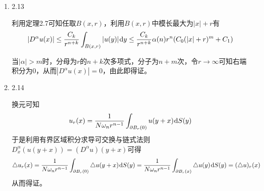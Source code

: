 \documentclass[a4paper,UTF8,fontset=windows,10pt]{ctexart}
\newcommand*{\dr}{\hspace{0.07em}\mathrm{d}}
\begin{document}
\begin{enumerate}
    \item 2.13
    
    利用定理2.7可知任取$B(x,r)$，利用$B(x,r)$中模长最大为$|x|+r$有
    $$|D^\alpha u(x)|\le\frac{C_k}{r^{n+k}}\int_{B(x,r)}|u(y)|\dr y\le\frac{C_k}{r^{n+k}}\alpha(n)r^n(C_0(|x|+r)^m+C_1)$$
    
    当$|\alpha|>m$时，分母为$r$的$n+k$次多项式，分子为$n+m$次，令$r\to\infty$可知右端积分为0，从而$|D^\alpha u(x)|=0$，由此即得证。
    
    \item 2.14
    
    换元可知
    $$u_r(x)=\frac{1}{N\omega_nr^{n-1}}\int_{\partial B_r(0)}u(y+x)\dr S(y)$$
    于是利用有界区域积分求导可交换与链式法则$D_x^\alpha(u(y+x))=(D^\alpha u)(y+x)$可得
    $$\triangle u_r(x)=\frac{1}{N\omega_nr^{n-1}}\int_{\partial B_r(0)}\triangle u(y+x)\dr S(y)=\frac{1}{N\omega_nr^{n-1}}\int_{\partial B_r(x)}\triangle u(y)\dr S(y)=(\triangle u)_r(x)$$
    从而得证。
\end{enumerate}
\end{document}
